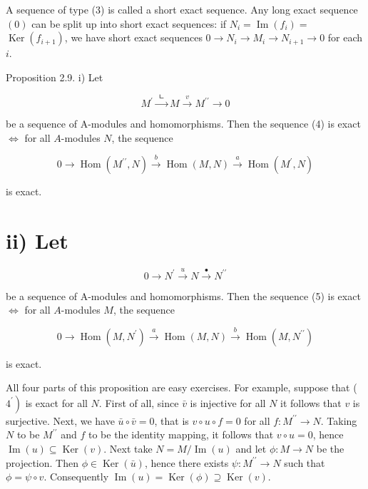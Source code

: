 \documentclass{standalone}
\theoremstyle{definition}
\theoremstyle{remark}
\begin{document}
A sequence of type (3) is called a short exact sequence. Any long exact sequence $(0)$ can be split up into short exact sequences: if $N_{i}=\operatorname{Im}\left(f_{i}\right)=$ $\operatorname{Ker}\left(f_{i+1}\right)$, we have short exact sequences $0 \rightarrow N_{i} \rightarrow M_{i} \rightarrow N_{i+1} \rightarrow 0$ for each $i$.

Proposition 2.9. i) Let

\[
M^{\prime} \stackrel{\text { ㄴ }}{\rightarrow} M \stackrel{v}{\rightarrow} M^{\prime \prime} \rightarrow 0
\]

be a sequence of A-modules and homomorphisms. Then the sequence (4) is exact $\Leftrightarrow$ for all $A$-modules $N$, the sequence

\[
0 \rightarrow \operatorname{Hom}\left(M^{\prime \prime}, N\right) \stackrel{b}{\rightarrow} \operatorname{Hom}(M, N) \stackrel{a}{\rightarrow} \operatorname{Hom}\left(M^{\prime}, N\right)
\]

is exact.

\section{ii) Let}
\[
0 \rightarrow N^{\prime} \stackrel{u}{\rightarrow} N \stackrel{\bullet}{\rightarrow} N^{\prime \prime}
\]

be a sequence of A-modules and homomorphisms. Then the sequence (5) is exact $\Leftrightarrow$ for all $A$-modules $M$, the sequence

\[
0 \rightarrow \operatorname{Hom}\left(M, N^{\prime}\right) \stackrel{a}{\rightarrow} \operatorname{Hom}(M, N) \stackrel{b}{\rightarrow} \operatorname{Hom}\left(M, N^{\prime \prime}\right)
\]

is exact.

All four parts of this proposition are easy exercises. For example, suppose that ( $\left.4^{\prime}\right)$ is exact for all $N$. First of all, since $\bar{v}$ is injective for all $N$ it follows that $v$ is surjective. Next, we have $\bar{u} \circ \bar{v}=0$, that is $v \circ u \circ f=0$ for all $f: M^{\prime \prime} \rightarrow N$. Taking $N$ to be $M^{\prime \prime}$ and $f$ to be the identity mapping, it follows that $v \circ u=0$, hence $\operatorname{Im}(u) \subseteq \operatorname{Ker}(v)$. Next take $N=M / \operatorname{Im}(u)$ and let $\phi: M \rightarrow N$ be the projection. Then $\phi \in \operatorname{Ker}(\bar{u})$, hence there exists $\psi: M^{\prime \prime} \rightarrow N$ such that $\phi=\psi \circ v$. Consequently $\operatorname{Im}(u)=\operatorname{Ker}(\phi) \supseteq \operatorname{Ker}(v)$.
\end{document}
